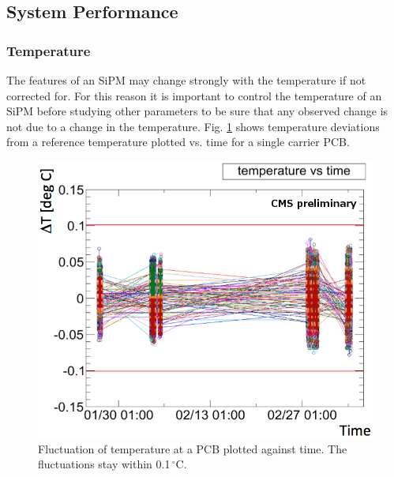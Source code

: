 \subsection{System Performance}
\subsubsection{Temperature}
The features of an SiPM may change strongly with the temperature if not corrected for. For this reason it is important to control the temperature of an SiPM before studying other parameters to be sure that any observed change is not due to a change in the temperature. Fig. \ref{kuenskentemperatureStability} shows  temperature deviations from a reference temperature plotted vs. time for a single carrier PCB.
\begin{figure}[h]
\centering
\begin{minipage}[t]{0.475\textwidth}
\includegraphics[width=\textwidth]{Figures/kuensken/temperature.png}
\caption{Fluctuation of temperature at a PCB plotted against time. The fluctuations stay within 0.1\,$^\circ$C.}
\label{kuenskentemperatureStability}
\end{minipage}
\hspace{0.5cm}
\begin{minipage}[t]{0.455\textwidth}

\end{minipage}
\end{figure}
